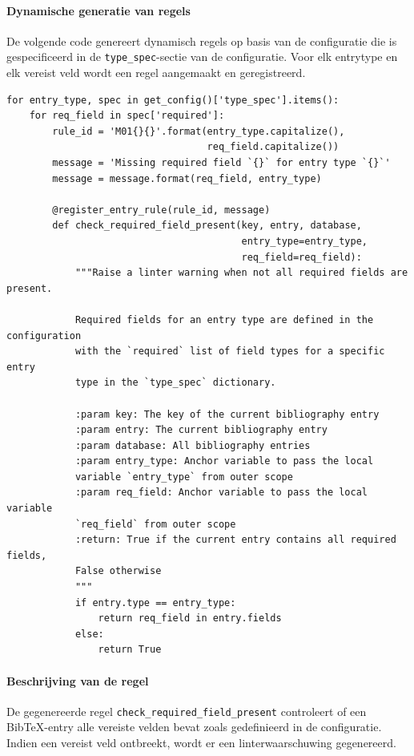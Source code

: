\paragraph{Dynamische generatie van regels}

De volgende code genereert dynamisch regels op basis van de configuratie die is gespecificeerd in de \texttt{type\_spec}-sectie van de configuratie. Voor elk entrytype en elk vereist veld wordt een regel aangemaakt en geregistreerd.

\begin{verbatim}
for entry_type, spec in get_config()['type_spec'].items():
    for req_field in spec['required']:
        rule_id = 'M01{}{}'.format(entry_type.capitalize(),
                                   req_field.capitalize())
        message = 'Missing required field `{}` for entry type `{}`'
        message = message.format(req_field, entry_type)

        @register_entry_rule(rule_id, message)
        def check_required_field_present(key, entry, database,
                                         entry_type=entry_type,
                                         req_field=req_field):
            """Raise a linter warning when not all required fields are present.

            Required fields for an entry type are defined in the configuration
            with the `required` list of field types for a specific entry
            type in the `type_spec` dictionary.

            :param key: The key of the current bibliography entry
            :param entry: The current bibliography entry
            :param database: All bibliography entries
            :param entry_type: Anchor variable to pass the local
            variable `entry_type` from outer scope
            :param req_field: Anchor variable to pass the local variable
            `req_field` from outer scope
            :return: True if the current entry contains all required fields,
            False otherwise
            """
            if entry.type == entry_type:
                return req_field in entry.fields
            else:
                return True
\end{verbatim}

\paragraph{Beschrijving van de regel}

De gegenereerde regel \texttt{check\_required\_field\_present} controleert of een BibTeX-entry alle vereiste velden bevat zoals gedefinieerd in de configuratie. Indien een vereist veld ontbreekt, wordt er een linterwaarschuwing gegenereerd.

